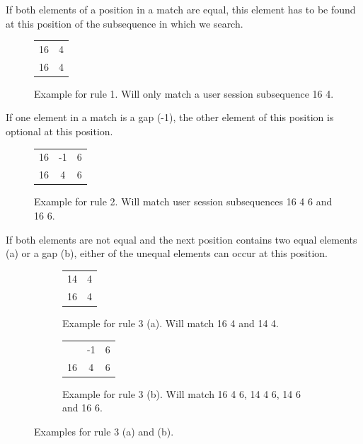 	\begin{rules}
		\item If both elements of a position in a match are equal, this element has to be found at this position of the subsequence in which we search.
	\end{rules}
	\begin{figure}[h]
		\centering
			\begin{tabular}{cc}
				 16 & 4\\
				 16 & 4\\
			\end{tabular}
		\caption{Example for rule 1. Will only match a user session subsequence 16 4.}
		\label{fig:rule1}
	\end{figure}


	\begin{rules}
		\item If one element in a match is a gap (-1), the other element of this position is optional at this position.
	\end{rules}
	\begin{figure}[h]
		\centering
			\begin{tabular}{ccc}
				16 & -1 &6\\
				16 &  4 & 6\\
			\end{tabular}
			\caption{Example for rule 2. Will match user session subsequences 16 4 6 and 16 6.}
		\label{fig:rule2}
	\end{figure}
	\clearpage
	\begin{rules}
	\item If both elements are not equal and the next position contains two equal elements (a) or a gap (b), either of the unequal elements can occur at this position.
	\end{rules}
	\begin{figure}[h]
		\centering
		\begin{subfigure}[b]{0.49\textwidth}
		\centering
			\begin{tabular}{cc}
				 14 & 4\\
				 16 & 4\\
			\end{tabular}
			\caption{Example for rule 3 (a). Will match 16 4 and 14 4.}
			\label{fig:rule3}
		\end{subfigure}
		\begin{subfigure}[b]{0.49\textwidth}
		\centering
			\begin{tabular}{ccc}
		\centering
				14 & -1 & 6\\
				16 & 4  & 6 \\
			\end{tabular}
			\caption{Example for rule 3 (b). Will match 16 4 6, 14 4 6, 14 6 and 16 6. }
		\end{subfigure}
		\caption{Examples for rule 3 (a) and (b).}
		\label{fig:rule3}
	\end{figure}
